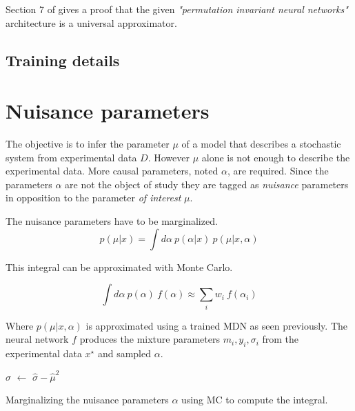 Section 7 of \cite{lucas:hal-01791126} gives a proof that the given \emph{"permutation invariant neural networks"} architecture is a universal approximator.

\subsection{Training details} %
\label{sub:training_details}


\section{Nuisance parameters} %
\label{sec:nuisance_parameters}



The objective is to infer the parameter $\mu$ of a model that describes a stochastic system from experimental data $D$.
However $\mu$ alone is not enough to describe the experimental data.
More causal parameters, noted $\alpha$, are required.
Since the parameters $\alpha$ are not the object of study they are tagged as \emph{nuisance} parameters in opposition to the parameter \emph{of interest} $\mu$.

The nuisance parameters have to be marginalized.
\begin{equation}
    p(\mu | x) = \int d\alpha ~ p(\alpha | x) ~ p(\mu | x, \alpha)
\end{equation}

This integral can be approximated with Monte Carlo.

\begin{equation}
  \int d\alpha ~ p(\alpha) ~ f(\alpha)
  \approx \sum_i w_i ~ f(\alpha_i)
\end{equation}

Where $p(\mu | x, \alpha)$ is approximated using a trained MDN as seen previously.
The neural network $f$ produces the mixture parameters $m_i, y_i, \sigma_i$ from the experimental data $x^\star$ and sampled $\alpha$.

\begin{algorithm}[H]
$\hat\sigma$  $\gets$ $\hat\sigma - \hat\mu^2$ \;
\caption{Marginalizing the nuisance parameters $\alpha$ using MC to compute the integral.}
\end{algorithm}

